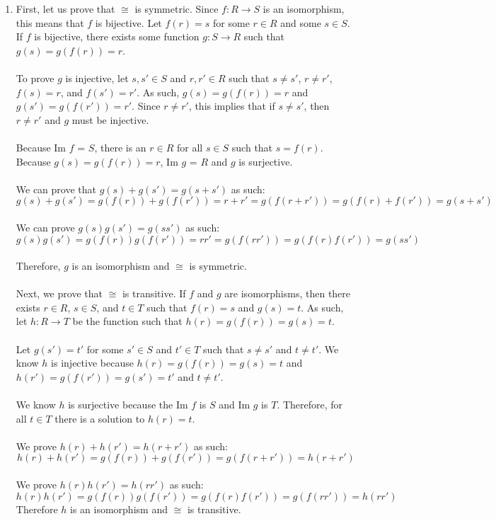 \documentclass{article}
\begin{document}
\begin{enumerate}
\item First, let us prove that $\cong$ is symmetric.
Since $f: R \rightarrow S$ is an isomorphism, this means that $f$ is bijective.
Let $f(r) = s$ for some $r \in R$ and some $s \in S$.
If $f$ is bijective, there exists some function $g: S \rightarrow R$ such that
$g(s) = g(f(r)) = r$. \\ \\
To prove $g$ is injective, let $s, s' \in S$ and $r, r' \in R$ such that
$s \neq s'$, $r \neq r'$, $f(s) = r$, and $f(s') = r'$.  As such,
$g(s) = g(f(r)) = r$ and $g(s') = g(f(r')) = r'$.  Since $r \neq r'$, this
implies that if $s \neq s'$, then $r \neq r'$ and $g$ must be injective. \\ \\
Because Im $f$ = $S$, there is an $r \in R$ for all $s \in S$ such that
$s = f(r)$.  Because $g(s) = g(f(r)) = r$, Im $g$ = $R$ and $g$ is surjective. \\ \\
We can prove that $g(s) + g(s') = g(s + s')$ as such: \\
\[
g(s) + g(s') = g(f(r)) + g(f(r')) = r + r' = g(f(r + r')) = g(f(r) + f(r')) = g(s + s')
\]
\\
We can prove $g(s)g(s') = g(ss')$ as such:
\[
g(s)g(s') = g(f(r))g(f(r')) = rr' = g(f(rr')) = g(f(r)f(r')) = g(ss')
\]
\\
Therefore, $g$ is an isomorphism and $\cong$ is symmetric.
\\ \\
Next, we prove that $\cong$ is transitive.  If $f$ and $g$ are isomorphisms,
then there exists $r \in R$, $s \in S$, and $t \in T$ such that
$f(r) = s$ and $g(s) = t$.  As such, let $h: R \rightarrow T$ be the function
such that $h(r) = g(f(r)) = g(s) = t$. \\ \\
Let $g(s') = t'$ for some $s' \in S$ and $t' \in T$ such that
$s \neq s'$ and $t \neq t'$.
We know $h$ is injective because $h(r) = g(f(r)) = g(s) = t$ and
$h(r') = g(f(r')) = g(s') = t'$ and $t \neq t'$.
\\ \\
We know $h$ is surjective because the Im $f$ is $S$ and Im $g$ is $T$.
Therefore, for all $t \in T$ there is a solution to $h(r) = t$.
\\ \\
We prove $h(r) + h(r') = h(r + r')$ as such:
\[
h(r) + h(r') = g(f(r)) + g(f(r')) = g(f(r + r')) = h(r + r')
\]
\\
We prove $h(r)h(r') = h(rr')$ as such:
\[
h(r)h(r') = g(f(r))g(f(r')) = g(f(r)f(r')) = g(f(rr')) = h(rr')
\]
Therefore $h$ is an isomorphism and $\cong$ is transitive.


\end{enumerate}
\end{document}
